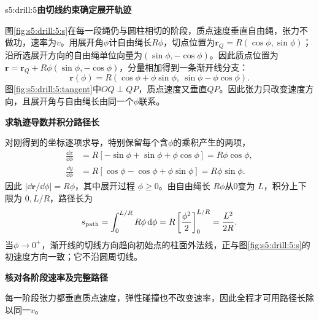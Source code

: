 \begin{drillsolution}{s5:drill:5}\textbf{由切线约束确定展开轨迹}\par\nobreak
图\ref{fig:s5:drill:5:s}在每一段绳仍与圆柱相切的阶段，质点速度垂直自由绳，张力不做功，速率为$v$。用展开角$\phi$计自由绳长$R\phi$，切点位置为$\boldsymbol r_Q=R(\cos\phi,\sin\phi)$；沿所选展开方向的自由绳单位向量为$(\sin\phi,-\cos\phi)$。因此质点位置为$\boldsymbol r=\boldsymbol r_Q+R\phi(\sin\phi,-\cos\phi)$，分量相加得到一条渐开线分支：
\[
\boldsymbol r(\phi)=R(\cos\phi+\phi\sin\phi,\ \sin\phi-\phi\cos\phi).
\]
图\ref{fig:s5:drill:5:tangent}中$OQ\perp QP$，质点速度又垂直$QP$。因此张力只改变速度方向，且展开角与自由绳长由同一个$\phi$联系。



\par\medskip{}\noindent\textbf{求轨迹导数并积分路径长}\par\nobreak
对刚得到的坐标逐项求导，特别保留每个含$\phi$的乘积产生的两项，
\begin{align*}
 \frac{\dd x}{\dd\phi}&=R[-\sin\phi+\sin\phi+\phi\cos\phi]=R\phi\cos\phi,\\
 \frac{\dd y}{\dd\phi}&=R[\cos\phi-\cos\phi+\phi\sin\phi]=R\phi\sin\phi.
\end{align*}
因此 $|\dd\boldsymbol r/\dd\phi|=R\phi$，其中展开过程 $\phi\ge0$。由自由绳长 $R\phi$从0变为 $L$，积分上下限为 $0,L/R$，路径长为
\[s_{\rm path}=\int_0^{L/R}R\phi\mathop{}\!\mathrm d\phi
 =R\left[\frac{\phi^2}{2}\right]_0^{L/R}
 =\frac{L^2}{2R}.\]
当$\phi\to0^+$，渐开线的切线方向趋向初始点的柱面外法线，正与图\ref{fig:s5:drill:5:s}的初速度方向一致；它不沿圆周切线。



\par\medskip{}\noindent\textbf{核对各阶段速率及完整路径}\par\nobreak
每一阶段张力都垂直质点速度，弹性碰撞也不改变速率，因此全程才可用路径长除以同一$v$。
\end{drillsolution}
